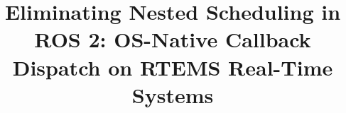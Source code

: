 \documentclass[conference]{IEEEtran}
\begin{document}
\title{Eliminating Nested Scheduling in ROS 2: OS-Native Callback Dispatch on RTEMS Real-Time Systems
}


\maketitle
\end{document}
